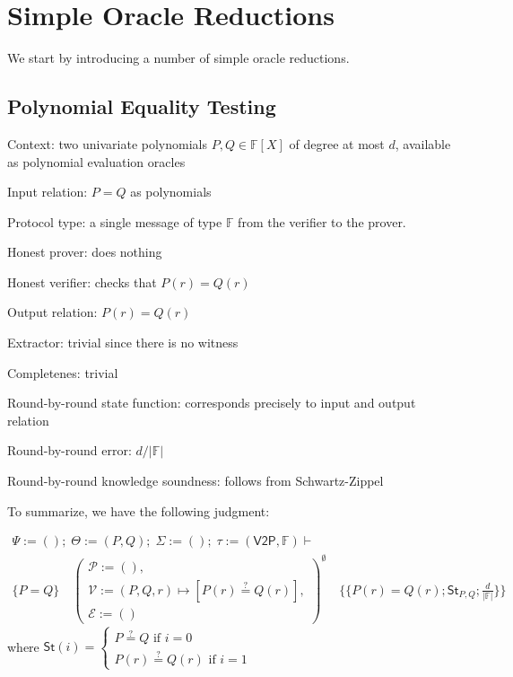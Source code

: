 \section{Simple Oracle Reductions}

We start by introducing a number of simple oracle reductions.

\subsection{Polynomial Equality Testing}

Context: two univariate polynomials $P, Q \in \mathbb{F}[X]$ of degree at most $d$, available as polynomial evaluation oracles

Input relation: $P = Q$ as polynomials

Protocol type: a single message of type $\mathbb{F}$ from the verifier to the prover.

Honest prover: does nothing

Honest verifier: checks that $P(r) = Q(r)$

Output relation: $P(r) = Q(r)$

Extractor: trivial since there is no witness

Completenes: trivial

Round-by-round state function: corresponds precisely to input and output relation

\newcommand{\abs}[1]{\lvert #1 \rvert}

Round-by-round error: $d / \abs{\mathbb{F}}$

Round-by-round knowledge soundness: follows from Schwartz-Zippel

To summarize, we have the following judgment:

\[
    \begin{array}{c}
        \Psi := (); \; \Theta := (P, Q); \; \Sigma := (); \; \tau := (\mathsf{V2P}, \mathbb{F}) \vdash \\[1ex]
        \{P = Q\} \quad \left(
        \begin{array}{l}
            \mathcal{P} := (), \\
            \mathcal{V} := (P,Q,r) \mapsto [P(r) \stackrel{?}{=} Q(r)], \\
            \mathcal{E} := ()
        \end{array}
        \right)^{\emptyset} \quad \{\!\!\{P(r) = Q(r); \mathsf{St}_{P,Q}; \frac{d}{\abs{\mathbb{F}}}\}\!\!\}
    \end{array}
\]
where $\mathsf{St}(i) = \begin{cases} P \stackrel{?}{=} Q \text{ if } i = 0 \\ P(r) \stackrel{?}{=} Q(r) \text{ if } i = 1 \end{cases}$

